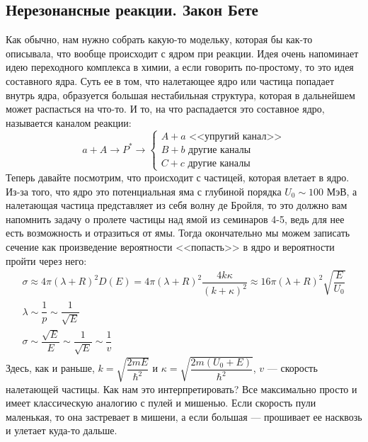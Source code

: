 \documentclass[12pt]{article}
\begin{document}
\subsection{Нерезонансные реакции. Закон Бете}
Как обычно, нам нужно собрать какую-то модельку, которая бы как-то описывала, что вообще происходит с ядром при реакции. Идея очень напоминает идею переходного комплекса в химии, а если говорить по-простому, то это идея составного ядра. Суть ее в том, что налетающее ядро или частица попадает внутрь ядра, образуется большая нестабильная структура, которая в дальнейшем может распасться на что-то. И то, на что распадается это составное ядро, называется каналом реакции:
\begin{equation*}
    a + A \rightarrow P^* \rightarrow 
    \begin{cases}
         A + a \text{ <<упругий канал>>}\\
         B + b \text{ другие каналы}\\
         C + c \text{ другие каналы}
    \end{cases}
\end{equation*}
Теперь давайте посмотрим, что происходит с частицей, которая влетает в ядро. Из-за того, что ядро это потенциальная яма с глубиной порядка $U_0 \sim 100$ МэВ, а налетающая частица представляет из себя волну де Бройля, то это должно вам напомнить задачу о пролете частицы над ямой из семинаров 4-5, ведь для нее есть возможность и отразиться от ямы. Тогда окончательно мы можем записать сечение как произведение вероятности <<попасть>> в ядро и вероятности пройти через него:
\begin{gather*}
    \sigma \approx 4\pi (\lambda + R)^2 D(E) = 4\pi (\lambda + R)^2 \dfrac{4k\kappa}{(k+\kappa)^2} \approx 16\pi (\lambda + R)^2 \sqrt{\dfrac{E}{U_0}}\\
    \lambda \sim \dfrac{1}{p} \sim \dfrac{1}{\sqrt{E}}\\
    \sigma \sim \dfrac{\sqrt{E}}{E} \sim \dfrac{1}{\sqrt{E}} \sim \dfrac{1}{v}
\end{gather*}
Здесь, как и раньше, $k = \sqrt{\dfrac{2mE}{\hbar^2}}$ и $ \kappa = \sqrt{\dfrac{2m(U_0 + E)}{\hbar^2}}$, $v$ --- скорость налетающей частицы. Как нам это интерпретировать? Все максимально просто и имеет классическую аналогию с пулей и мишенью. Если скорость пули маленькая, то она застревает в мишени, а если большая --- прошивает ее насквозь и улетает куда-то дальше.
\end{document}
